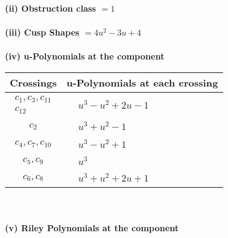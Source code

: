 \documentclass[1p]{elsarticle_modified}
\theoremstyle{definition}
\begin{document}
\flushleft \textbf{(ii) Obstruction class $= 1$}\\~\\
\flushleft \textbf{(iii) Cusp Shapes $= 4 u^2-3 u+4$}\\~\\
\newpage\renewcommand{\arraystretch}{1}
\flushleft \textbf{(iv) u-Polynomials at the component}\newline \\
\begin{tabular}{m{50pt}|m{274pt}}
Crossings & \hspace{64pt}u-Polynomials at each crossing \\
\hline $$\begin{aligned}c_{1},c_{3},c_{11}\\c_{12}\end{aligned}$$&$\begin{aligned}
&u^3- u^2+2 u-1
\end{aligned}$\\
\hline $$\begin{aligned}c_{2}\end{aligned}$$&$\begin{aligned}
&u^3+u^2-1
\end{aligned}$\\
\hline $$\begin{aligned}c_{4},c_{7},c_{10}\end{aligned}$$&$\begin{aligned}
&u^3- u^2+1
\end{aligned}$\\
\hline $$\begin{aligned}c_{5},c_{9}\end{aligned}$$&$\begin{aligned}
&u^3
\end{aligned}$\\
\hline $$\begin{aligned}c_{6},c_{8}\end{aligned}$$&$\begin{aligned}
&u^3+u^2+2 u+1
\end{aligned}$\\
\hline
\end{tabular}\\~\\
\newpage\renewcommand{\arraystretch}{1}
\flushleft \textbf{(v) Riley Polynomials at the component}\newline \\
\end{document}

